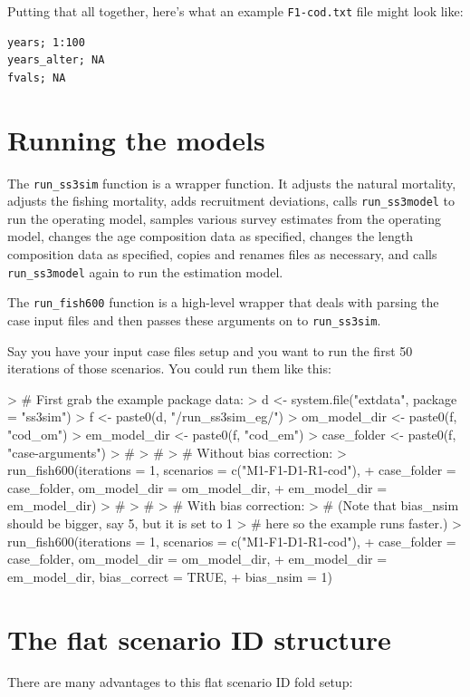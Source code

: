 \documentclass[12pt]{article}
\begin{document}
Putting that all together, here's what an example \texttt{F1-cod.txt} file 
might look like:

\begin{verbatim}
years; 1:100
years_alter; NA 
fvals; NA
\end{verbatim}

\section*{Running the models}

The \texttt{run\_ss3sim} function is a wrapper function. It adjusts the natural 
mortality, adjusts the fishing mortality, adds recruitment deviations, calls 
\texttt{run\_ss3model} to run the operating model, samples various survey 
estimates from the operating model, changes the age composition data as 
specified, changes the length composition data as specified, copies and renames 
files as necessary, and calls \texttt{run\_ss3model} again to run the 
estimation model.

The \texttt{run\_fish600} function is a high-level wrapper that deals with 
parsing the case input files and then passes these arguments on to 
\texttt{run\_ss3sim}.

Say you have your input case files setup and you want to run the first 
50 iterations of those scenarios. You could run them like this:

\begin{Schunk}
\begin{Sinput}
> # First grab the example package data:
> d <- system.file("extdata", package = "ss3sim")
> f <- paste0(d, "/run_ss3sim_eg/")
> om_model_dir <- paste0(f, "cod_om")
> em_model_dir <- paste0(f, "cod_em")
> case_folder <- paste0(f, "case-arguments")
> #
> #
> # Without bias correction:
> run_fish600(iterations = 1, scenarios = c("M1-F1-D1-R1-cod"),
+ case_folder = case_folder, om_model_dir = om_model_dir,
+ em_model_dir = em_model_dir)
> #
> #
> # With bias correction:
> # (Note that bias_nsim should be bigger, say 5, but it is set to 1
> # here so the example runs faster.)
> run_fish600(iterations = 1, scenarios = c("M1-F1-D1-R1-cod"),
+ case_folder = case_folder, om_model_dir = om_model_dir,
+ em_model_dir = em_model_dir, bias_correct = TRUE,
+ bias_nsim = 1)
\end{Sinput}
\end{Schunk}


\section*{The flat scenario ID structure}
There are many advantages to this flat scenario ID fold setup:
\end{document}
